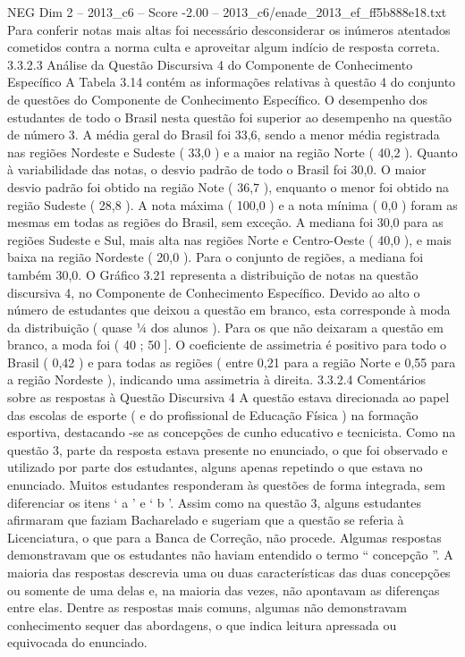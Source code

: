 \begin{textsample}{NEG Dim 2 – 2013\_c6 – Score -2.00 – 2013\_c6/enade\_2013\_ef\_ff5b888e18.txt}
Para conferir notas mais altas foi necessário desconsiderar os inúmeros atentados cometidos contra a norma culta e aproveitar algum indício de resposta correta. 3.3.2.3 Análise da Questão Discursiva 4 do Componente de Conhecimento Específico A Tabela 3.14 contém as informações relativas à questão 4 do conjunto de questões do Componente de Conhecimento Específico.
O desempenho dos estudantes de todo o Brasil nesta questão foi superior ao desempenho na questão de número 3.
A média geral do Brasil foi 33,6, sendo a menor média registrada nas regiões Nordeste e Sudeste ( 33,0 ) e a maior na região Norte ( 40,2 ).
Quanto à variabilidade das notas, o desvio padrão de todo o Brasil foi 30,0.
O maior desvio padrão foi obtido na região Note ( 36,7 ), enquanto o menor foi obtido na região Sudeste ( 28,8 ).
A nota máxima ( 100,0 ) e a nota mínima ( 0,0 ) foram as mesmas em todas as regiões do Brasil, sem exceção.
A mediana foi 30,0 para as regiões Sudeste e Sul, mais alta nas regiões Norte e Centro-Oeste ( 40,0 ), e mais baixa na região Nordeste ( 20,0 ).
Para o conjunto de regiões, a mediana foi também 30,0.
O Gráfico 3.21 representa a distribuição de notas na questão discursiva 4, no Componente de Conhecimento Específico.
Devido ao alto o número de estudantes que deixou a questão em branco, esta corresponde à moda da distribuição ( quase ¼ dos alunos ).
Para os que não deixaram a questão em branco, a moda foi ( 40 ; 50 ].
O coeficiente de assimetria é positivo para todo o Brasil ( 0,42 ) e para todas as regiões ( entre 0,21 para a região Norte e 0,55 para a região Nordeste ), indicando uma assimetria à direita. 3.3.2.4 Comentários sobre as respostas à Questão Discursiva 4 A questão estava direcionada ao papel das escolas de esporte ( e do profissional de Educação Física ) na formação esportiva, destacando -se as concepções de cunho educativo e tecnicista.
Como na questão 3, parte da resposta estava presente no enunciado, o que foi observado e utilizado por parte dos estudantes, alguns apenas repetindo o que estava no enunciado.
Muitos estudantes responderam às questões de forma integrada, sem diferenciar os itens ‘ a ’ e ‘ b ’.
Assim como na questão 3, alguns estudantes afirmaram que faziam Bacharelado e sugeriam que a questão se referia à Licenciatura, o que para a Banca de Correção, não procede.
Algumas respostas demonstravam que os estudantes não haviam entendido o termo “ concepção ”.
A maioria das respostas descrevia uma ou duas características das duas concepções ou somente de uma delas e, na maioria das vezes, não apontavam as diferenças entre elas.
Dentre as respostas mais comuns, algumas não demonstravam conhecimento sequer das abordagens, o que indica leitura apressada ou equivocada do enunciado.

\end{textsample}
